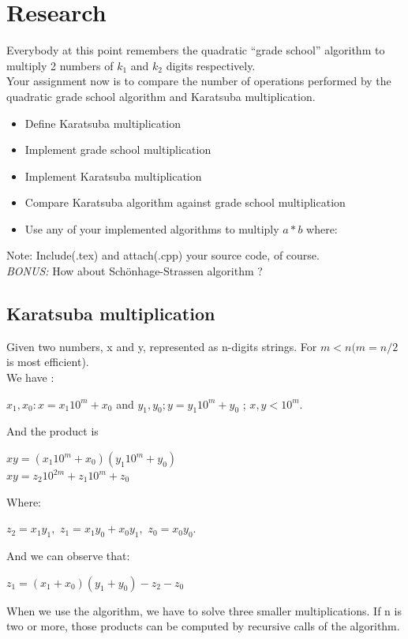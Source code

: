 \documentclass[12pt]{article}
\begin{document}
\section{Research}

Everybody at this point remembers the quadratic ``grade school'' algorithm to multiply 2 numbers of $k_{1}$ and $k_{2}$ digits respectively. \\

Your assignment now is to compare the number of operations performed by the quadratic grade school algorithm and Karatsuba multiplication.

\begin{itemize}
    \item Define Karatsuba multiplication
    \item Implement grade school multiplication
    \item Implement Karatsuba multiplication
    \item Compare Karatsuba algorithm against grade school multiplication
    \item Use any of your implemented algorithms to multiply $a*b$ where:
\end{itemize}

Note: Include(.tex) and attach(.cpp) your source code, of course.\\

\emph{BONUS:} How about Sch\"{o}nhage-Strassen algorithm ? 

\subsection*{Karatsuba multiplication}

Given two numbers, x and y, represented as n-digits strings. For $m < n (m = n/2$ is most efficient).
\\
We have :
\begin{center}
    $x_1, x_0: x = x_1 10^m+x_0$ and $y_1, y_0; y = y_1 10^m+y_0$ ; $x,y<10^m$.
\end{center}
And the product is
\begin{center}
    $xy = (x_1 10^m+x_0)(y_1 10^m+y_0)$\\
    $xy = z_2 10^{2m}+z_1 10^m + z_0$
\end{center}
Where:
\begin{center}
    $z_2 = x_1y_1,$
    $z_1 = x_1y_0+x_0y_1,$
    $z_0 = x_0y_0.$
\end{center}
And we can observe that:
\begin{center}
    $z_1=(x_1+x_0)(y_1+y_0)-z_2-z_0$
\end{center}
When we use the algorithm, we have to solve three smaller multiplications. If n is two or more, those products can be computed by recursive calls of the algorithm.
\end{document}
